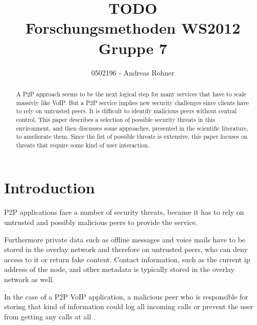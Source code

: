 \documentclass[a4paper,10pt]{article}
\title{TODO\\
Forschungsmethoden WS2012\\
Gruppe 7}
\author{0502196 - Andreas Rohner\\
}
\begin{document}
\maketitle

\begin{abstract}
A P2P approach seems to be the next logical step for many services that have to
scale massivly like VoIP. But a P2P service implies new security challenges
since clients have to rely on untrusted peers. It is difficult to identify
malicious peers without central control. This paper describes a selection of
possible security threats in this
environment, and then discusses some approaches, presented in the scientific
literature, to ameliorate them. Since the list of possible threats is extensive,
this paper focuses on threats that require some kind of user interaction.
\end{abstract}

\section{Introduction}

P2P applications face a number of security threats, because it has
to rely on untrusted and possibly malicious peers to provide the service.

Furthermore private data such as offline messages and voice mails have to be
stored in the overlay network and therefore on untrusted peers, who can
deny access to it or return fake content. Contact information, such as the
current ip address of the node, and other metadata is typically stored in the
overlay network as well.

In the case of a P2P VoIP application, a malicious peer who is
responsible for storing that kind of information could log all incoming calls or
prevent the user from getting any calls at all
\cite{touceda}.

\end{document}
